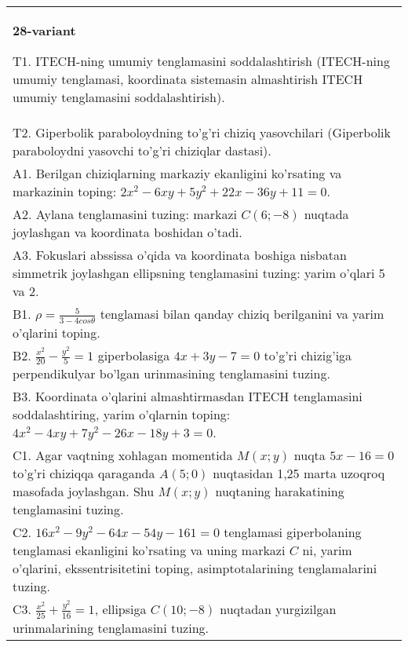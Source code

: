 \documentclass{article}
\begin{document}
\begin{tabular}{m{17cm}}
\textbf{28-variant}
\newline

T1. ITECH-ning umumiy tenglamasini soddalashtirish (ITECH-ning umumiy tenglamasi, koordinata sistemasin almashtirish ITECH umumiy tenglamasini soddalashtirish).\\

T2. Giperbolik paraboloydning to'g'ri chiziq yasovchilari (Giperbolik paraboloydni yasovchi to'g'ri chiziqlar dastasi).\\

A1. Berilgan chiziqlarning markaziy ekanligini ko'rsating va markazinin toping: $2x^{2}-6xy+5y^{2}+22x-36y+11=0$.\\

A2. Aylana tenglamasini tuzing: markazi $C(6;-8)$ nuqtada joylashgan va koordinata boshidan o'tadi.\\

A3. Fokuslari abssissa o'qida va koordinata boshiga nisbatan simmetrik joylashgan ellipsning tenglamasini tuzing: yarim o'qlari 5 va 2.\\

B1. $\rho = \frac{5}{3 - 4cos\theta}$ tenglamasi bilan qanday chiziq berilganini va yarim o'qlarini toping.  \\

B2. $\frac{x^{2}}{20} - \frac{y^{2}}{5} = 1$ giperbolasiga $4x + 3y - 7 = 0$ to'g'ri chizig'iga perpendikulyar bo'lgan urinmasining tenglamasini tuzing.  \\

B3. Koordinata o'qlarini almashtirmasdan ITECH tenglamasini soddalashtiring, yarim o'qlarnin toping: $4x^{2} - 4xy + 7y^{2} - 26x - 18y + 3 = 0$.\\

C1. Agar vaqtning xohlagan momentida $M(x;y)$ nuqta $5x - 16 = 0$ to'g'ri chiziqqa qaraganda $A(5;0)$ nuqtasidan 1,25 marta uzoqroq masofada joylashgan. Shu $M(x;y)$ nuqtaning harakatining tenglamasini tuzing.  \\

C2. $16x^{2} - 9y^{2} - 64x - 54y - 161 = 0$ tenglamasi giperbolaning tenglamasi ekanligini ko'rsating va uning markazi $C$ ni, yarim o'qlarini, ekssentrisitetini toping, asimptotalarining tenglamalarini tuzing.  \\

C3. $\frac{x^{2}}{25} + \frac{y^{2}}{16} = 1$, ellipsiga $C(10; - 8)$ nuqtadan yurgizilgan urinmalarining tenglamasini tuzing.  \\

\end{tabular}
\vspace{1cm}
\end{document}
